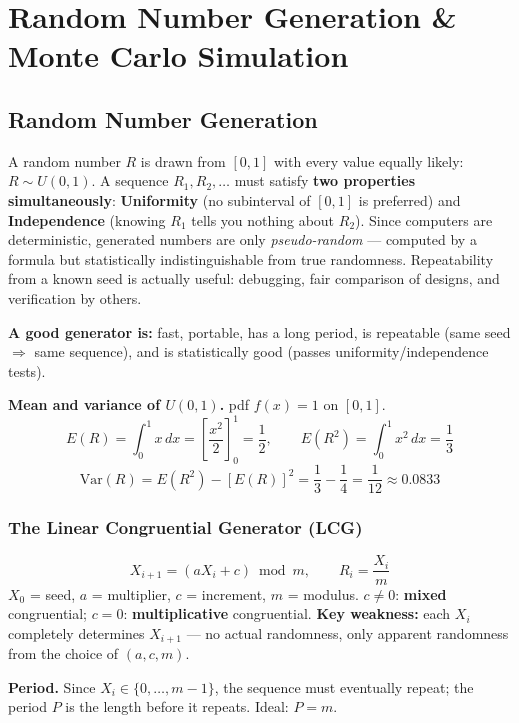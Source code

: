 \section{Random Number Generation \& Monte Carlo Simulation}

\subsection{Random Number Generation}

\begin{defbox}
A random number $R$ is drawn from $[0,1]$ with every value equally likely: $R\sim U(0,1)$. A sequence $R_1,R_2,\dots$ must satisfy \textbf{two properties simultaneously}: \textbf{Uniformity} (no subinterval of $[0,1]$ is preferred) and \textbf{Independence} (knowing $R_1$ tells you nothing about $R_2$). Since computers are deterministic, generated numbers are only \emph{pseudo-random} — computed by a formula but statistically indistinguishable from true randomness. Repeatability from a known seed is actually useful: debugging, fair comparison of designs, and verification by others.
\end{defbox}

\textbf{A good generator is:} fast, portable, has a long period, is repeatable (same seed $\Rightarrow$ same sequence), and is statistically good (passes uniformity/independence tests).

\begin{examplebox}
\textbf{Mean and variance of $U(0,1)$.} pdf $f(x)=1$ on $[0,1]$.
\[
E(R) = \int_0^1 x\,dx = \left[\frac{x^2}{2}\right]_0^1 = \frac12, \qquad E(R^2)=\int_0^1 x^2\,dx=\frac13
\]
\[
\mathrm{Var}(R) = E(R^2)-[E(R)]^2 = \frac13-\frac14 = \frac{1}{12}\approx0.0833
\]
\end{examplebox}

\subsubsection{The Linear Congruential Generator (LCG)}

\[
X_{i+1} = (aX_i+c)\bmod m, \qquad R_i = \frac{X_i}{m}
\]
$X_0$ = seed, $a$ = multiplier, $c$ = increment, $m$ = modulus. $c\neq0$: \textbf{mixed} congruential; $c=0$: \textbf{multiplicative} congruential. \textbf{Key weakness:} each $X_i$ completely determines $X_{i+1}$ — no actual randomness, only apparent randomness from the choice of $(a,c,m)$.

\textbf{Period.} Since $X_i\in\{0,\dots,m-1\}$, the sequence must eventually repeat; the period $P$ is the length before it repeats. Ideal: $P=m$.

